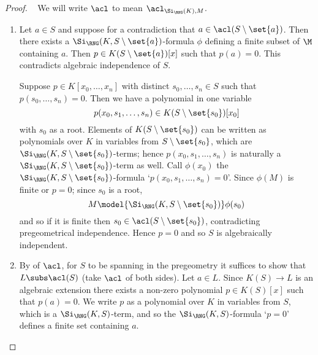 \begin{proof}~
    We will write $\acl$ to mean $\acl_{\Si_\RNG(K),M}$.
    \begin{enumerate}
        \item \begin{forward}
            Let $a \in S$ and suppose for a contradiction that 
            $a \in \acl(S \setminus \set{a})$.
            Then there exists a $\Si_\RNG(K,S \setminus \set{a})$-formula $\phi$
            defining a finite subset of $\M$ containing $a$.
            Then  
            $p \in K(S \setminus \set{a})[x]$ such that 
            $p(a) = 0$.
            This contradicts algebraic independence of $S$.
        \end{forward}

        \begin{backward}
            Suppose $p \in K[x_0,\dots,x_n]$ with distinct $s_0,\dots,s_n \in S$
            such that $p(s_0,\dots,s_n) = 0$.
            Then we have a polynomial in one variable
            \[p(x_0,s_1,\dots,s_n) \in K(S \setminus \set{s_0})[x_0]\]
            with $s_0$ as a root.
            Elements of $K(S \setminus \set{s_0})$ can be written as 
            polynomials over $K$ in variables from $S \setminus \set{s_0}$,
            which are $\Si_\RNG(K,S \setminus \set{s_0})$-terms;
            hence $p(x_0,s_1,\dots,s_n)$ is naturally a 
            $\Si_\RNG(K,S \setminus \set{s_0})$-term
            as well.
            Call $\phi(x_0)$ the $\Si_\RNG(K,S \setminus \set{s_0})$-formula 
            `$p(x_0,s_1,\dots,s_n) = 0$'.
            Since 
             $\phi(M)$
            is finite or $p = 0$; since $s_0$ is a root, 
            \[M \model{\Si_\RNG (K,S \setminus \set{s_0})} \phi(s_0)\]
            and so if it is finite then $s_0 \in \acl(S \setminus \set{s_0})$,
            contradicting pregeometrical independence.
            Hence $p = 0$ and so $S$ is algebraically independent.
        \end{backward}
        \item \begin{forward}
            By  of $\acl$, 
            for $S$ to be spanning in the pregeometry 
            it suffices to show that $L \subs \acl(S)$ 
            (take $\acl$ of both sides).
            Let $a \in L$.
            Since $K(S) \to L$ is an algebraic extension 
            there exists a non-zero polynomial 
            $p \in K(S)[x]$ such that $p(a) = 0$.
            We write $p$ as a polynomial over $K$ in variables from $S$,
            which is a $\Si_\RNG(K,S)$-term, 
            and so the $\Si_\RNG(K,S)$-formula `$p = 0$'
            defines a finite set containing $a$.
        \end{forward}
        

\end{enumerate}
\end{proof}
